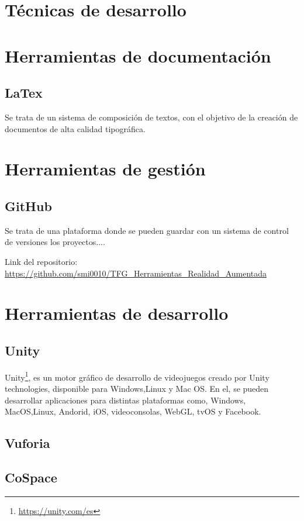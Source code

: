 

\section{Técnicas de desarrollo}

\section{Herramientas de documentación}
\subsection{LaTex}
Se trata de un sistema de composición de textos, con el objetivo de la creación de documentos de alta calidad tipográfica.
\section{Herramientas de gestión}
\subsection{GitHub}
Se trata de una plataforma donde se pueden guardar con un sistema de control de versiones los proyectos....

 Link del repositorio: \url{https://github.com/smi0010/TFG_Herramientas_Realidad_Aumentada}

\section{Herramientas de desarrollo}
\subsection{Unity}
Unity\footnote{\url{https://unity.com/es}}, es un motor gráfico de desarrollo de videojuegos creado por Unity technologies, disponible para Windows,Linux y Mac OS. En el, se pueden desarrollar aplicaciones para distintas plataformas como, Windows, MacOS,Linux, Andorid, iOS, videoconsolas, WebGL, tvOS y Facebook.
\subsection{Vuforia}
\subsection{CoSpace}


